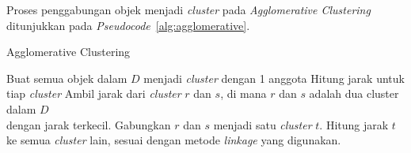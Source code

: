 Proses penggabungan objek menjadi \textit{cluster} pada \textit{Agglomerative Clustering} ditunjukkan pada \textit{Pseudocode}~\ref{alg:agglomerative}. \\
\begin{algorithm}[H]
	\caption{Agglomerative Clustering}
	\label{alg:agglomerative}
	\begin{algorithmic}[1]
		\STATE Buat semua objek dalam $D$ menjadi \textit{cluster} dengan 1 anggota
		\STATE Hitung jarak untuk tiap \textit{cluster}
		\STATE Ambil jarak dari \textit{cluster} $r$ dan $s$, di mana $r$ dan $s$ adalah dua cluster dalam $D$ \\ dengan jarak terkecil.
		\STATE Gabungkan $r$ dan $s$ menjadi satu \textit{cluster} $t$. 
		\STATE Hitung jarak $t$ ke semua \textit{cluster} lain, sesuai dengan metode \textit{linkage} yang digunakan.
		\ENDWHILE
	\end{algorithmic}
\end{algorithm}

